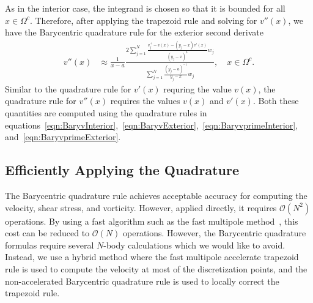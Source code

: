 \documentclass[preprint, 10pt]{elsarticle}
\begin{document}
As in the interior case, the integrand is chosen so that it is bounded
for all $x \in \Omega^c$.  Therefore, after applying the trapezoid rule
and solving for $v''(x)$, we have the Barycentric quadrature rule for
the exterior second derivate
\begin{align}
  v''(x) &\approx \frac{1}{x-a}\frac{2\sum\limits_{j=1}^N
    \frac{v^{+}_{j} - v(x) - (y_j-x)v'(x)}{(y_j-x)^3}w_j}
    {\sum\limits_{j=1}^N \frac{(y_j-a)^{-1}}{y_j-x}w_j}, 
    \quad x \in \Omega^c.
\end{align}
Similar to the quadrature rule for $v'(x)$ requring the value $v(x)$,
the quadrature rule for $v''(x)$ requires the values $v(x)$ and $v'(x)$.
Both these quantities are computed using the quadrature rules in
equations~\eqref{eqn:BaryvInterior},~\eqref{eqn:BaryvExterior},~\eqref{eqn:BaryvprimeInterior},
and~\eqref{eqn:BaryvprimeExterior}.



\subsection{Efficiently Applying the Quadrature}
\label{sec:fmm}
The Barycentric quadrature rule achieves acceptable accuracy for
computing the velocity, shear stress, and vorticity.  However, applied
directly, it requires $\mathcal{O}(N^2)$ operations.  By using a fast
algorithm such as the fast multipole method~\cite{gre-rok1987}, this
cost can be reduced to $\mathcal{O}(N)$ operations.  However, the
Barycentric quadrature formulas require several $N$-body calculations
which we would like to avoid.  Instead, we use a hybrid method where the
fast multipole accelerate trapezoid rule is used to compute the velocity
at most of the discretization points, and the non-accelerated
Barycentric quadrature rule is used to locally correct the trapezoid
rule.
\end{document}
